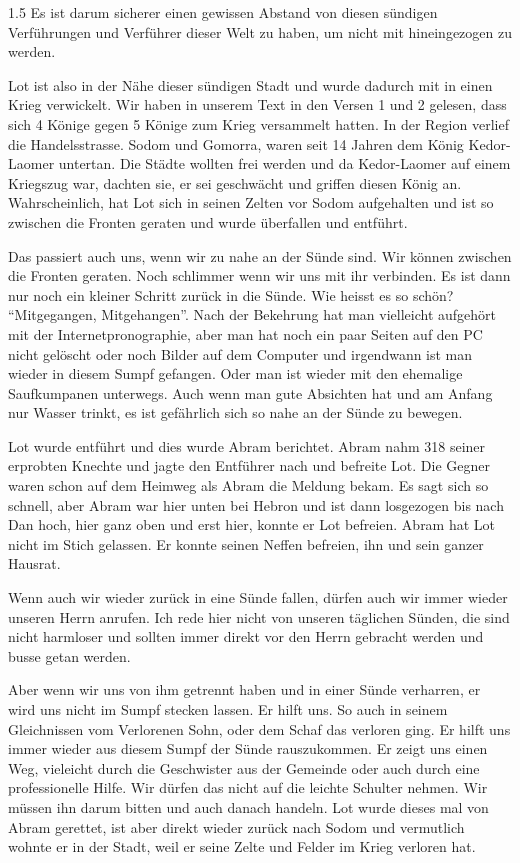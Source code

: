 \documentclass[fontsize=14pt]{../../inc/mybib}
\begin{document}
\begin{spacing}{1.5}
    Es ist darum sicherer einen gewissen Abstand von diesen sündigen Verführungen und Verführer dieser Welt zu haben, um nicht mit hineingezogen zu werden.

    Lot ist also in der Nähe dieser sündigen Stadt und wurde dadurch mit in einen Krieg verwickelt. Wir haben in unserem Text in den Versen 1 und 2 gelesen, dass sich 4 Könige gegen 5 Könige zum Krieg versammelt hatten. In der Region verlief die Handelsstrasse. Sodom und Gomorra, waren seit 14 Jahren dem König Kedor-Laomer untertan. Die Städte wollten frei werden und da Kedor-Laomer auf einem Kriegszug war, dachten sie, er sei geschwächt und griffen diesen König an. Wahrscheinlich, hat Lot sich in seinen Zelten vor Sodom aufgehalten und ist so zwischen die Fronten geraten und wurde überfallen und entführt.
    
    Das passiert auch uns, wenn wir zu nahe an der Sünde sind. Wir können zwischen die Fronten geraten. Noch schlimmer wenn wir uns mit ihr verbinden. Es ist dann nur noch ein kleiner Schritt zurück in die Sünde.  Wie heisst es so schön? \enquote{Mitgegangen, Mitgehangen}. Nach der Bekehrung hat man vielleicht aufgehört mit der Internetpronographie, aber man hat noch ein paar Seiten auf den PC nicht gelöscht oder noch Bilder auf dem Computer und irgendwann ist man wieder in diesem Sumpf gefangen. Oder man ist wieder mit den ehemalige Saufkumpanen unterwegs. Auch wenn man gute Absichten hat und am Anfang nur Wasser trinkt, es ist gefährlich sich so nahe an der Sünde zu bewegen.

    Lot wurde entführt und dies wurde Abram berichtet. Abram nahm 318 seiner erprobten Knechte und jagte den Entführer nach und befreite Lot. Die Gegner waren schon auf dem Heimweg als Abram die Meldung bekam. Es sagt sich so schnell, aber Abram war hier unten bei Hebron und ist dann losgezogen  bis nach Dan hoch, hier ganz oben und erst hier, konnte er Lot befreien. Abram hat Lot nicht im Stich gelassen. Er konnte seinen Neffen befreien, ihn und sein ganzer Hausrat.

    Wenn auch wir wieder zurück in eine Sünde fallen, dürfen auch wir immer wieder unseren Herrn anrufen. Ich rede hier nicht von unseren täglichen Sünden, die sind nicht harmloser und sollten immer direkt vor den Herrn gebracht werden und busse getan werden.

    Aber wenn wir uns von ihm getrennt haben und in einer Sünde verharren, er wird uns nicht im Sumpf stecken lassen. Er hilft uns. So auch in seinem Gleichnissen vom Verlorenen Sohn, oder dem Schaf das verloren ging. Er hilft uns immer wieder aus diesem Sumpf der Sünde rauszukommen. Er zeigt uns einen Weg, vieleicht durch die Geschwister aus der Gemeinde oder auch durch eine professionelle Hilfe. Wir dürfen das nicht auf die leichte Schulter nehmen. Wir müssen ihn darum bitten und auch danach handeln. Lot wurde dieses mal von Abram gerettet, ist aber direkt wieder zurück nach Sodom und vermutlich wohnte er in der Stadt, weil er seine Zelte und Felder im Krieg verloren hat.


\end{spacing}
\end{document}
